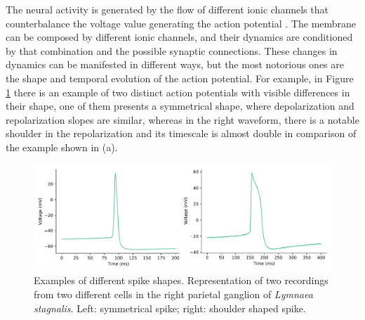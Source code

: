 The neural activity is generated by the flow of different ionic channels that counterbalance the voltage value generating the action potential \parencite{koch_biophysics_1999}. The membrane can be composed by different ionic channels, and their dynamics are conditioned by that combination and the possible synaptic connections. These changes in dynamics can be manifested in different ways, but the most notorious ones are the shape and temporal evolution of the action potential. %
For example, in Figure \ref{fig:spike-types} there is an example of two distinct action potentials with visible differences in their shape, one of them presents a symmetrical shape, where depolarization and repolarization slopes are similar, whereas in the right waveform, there is a notable shoulder in the repolarization and its timescale is almost double in comparison of the example shown in (a).

\begin{figure}[htb!]
    \centering
    \includegraphics[width=\linewidth]{img/intro/spike-types.pdf}
    \caption{Examples of different spike shapes. Representation of two recordings from two different cells in the right parietal ganglion of \textit{Lymnaea stagnalis}. Left: symmetrical spike; right: shoulder shaped spike.}
    \label{fig:spike-types}
\end{figure}

